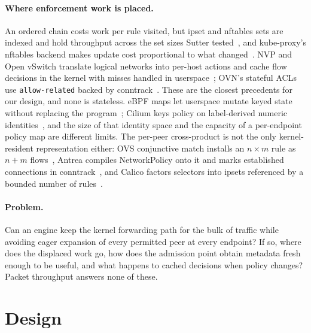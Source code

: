\paragraph{Where enforcement work is placed.}
An ordered chain costs work per rule visited, but ipset and nftables sets
are indexed and hold throughput across the set sizes Sutter
tested~\cite{sutter2017nftables}, and kube-proxy's nftables backend makes
update cost proportional to what changed~\cite{winship2025nftables}. NVP
and Open vSwitch translate logical networks into per-host actions and
cache flow decisions in the kernel with misses handled in
userspace~\cite{koponen2014nvp,pfaff2015ovs}; OVN's stateful ACLs use
\texttt{allow-related} backed by conntrack~\cite{ovnacl}. These are the
closest precedents for our design, and none is stateless. eBPF maps let
userspace mutate keyed state without replacing the
program~\cite{linuxbpfmaps}; Cilium keys policy on label-derived numeric
identities~\cite{ciliumidentities}, and the size of that identity space
and the capacity of a per-endpoint policy map are different limits. The
per-peer cross-product is not the only kernel-resident representation
either: OVS conjunctive match installs an $n\times m$ rule as $n+m$
flows~\cite{ovsfields}, Antrea compiles NetworkPolicy onto it and marks
established connections in conntrack~\cite{antreapipeline}, and Calico
factors selectors into ipsets referenced by a bounded number of
rules~\cite{calicoarch}.

\paragraph{Problem.}
Can an engine keep the kernel forwarding path for the bulk of traffic
while avoiding eager expansion of every permitted peer at every endpoint?
If so, where does the displaced work go, how does the admission point
obtain metadata fresh enough to be useful, and what happens to cached
decisions when policy changes? Packet throughput answers none of these.

\section{Design}
\label{sec:design}
